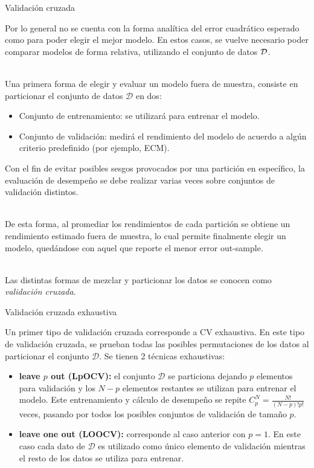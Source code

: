 \documentclass[9pt]{beamer}
\begin{document}
\begin{frame}{Validación cruzada}

Por lo general no se cuenta con la forma analítica del error cuadrático esperado como para poder elegir el mejor modelo. En estos casos, se vuelve necesario poder comparar modelos de forma relativa, utilizando el conjunto de datos ${\mathcal D}$.\\~\ \pause

Una primera forma de elegir y evaluar un modelo fuera de muestra, consiste en particionar el conjunto de datos $\mathcal{D}$ en dos:

\begin{itemize}
	\item Conjunto de entrenamiento: se utilizará para entrenar el modelo.\pause
	\item Conjunto de validación: medirá el rendimiento del modelo de acuerdo a algún criterio predefinido (por ejemplo, ECM).\pause
\end{itemize}

Con el fin de evitar posibles sesgos provocados por una partición en específico, la evaluación de desempeño se debe realizar varias veces sobre conjuntos de validación distintos.\\~\ \pause

De esta forma, al promediar los rendimientos de cada partición se obtiene un rendimiento estimado fuera de muestra, lo cual permite finalmente elegir un modelo, quedándose con aquel que reporte el menor error out-sample.\\~\ \pause

Las distintas formas de mezclar y particionar los datos se conocen como \emph{validación cruzada}.
	
\end{frame}


\begin{frame}{Validación cruzada exhaustiva}

Un primer tipo de validación cruzada corresponde a CV exhaustiva. En este tipo de validación cruzada, se prueban todas las posibles permutaciones de los datos al particionar el conjunto $\mathcal{D}$. \pause Se tienen 2 técnicas exhaustivas:

\begin{itemize}
	\item \textbf{leave $p$ out (LpOCV):} el conjunto $\mathcal{D}$ se particiona dejando $p$ elementos para validación y los $N-p$ elementos restantes se utilizan para entrenar el modelo. Este entrenamiento y cálculo de desempeño se repite $C_p^N=\frac{N!}{(N-p)!p!}$ veces, pasando por todos los posibles conjuntos de validación de tamaño $p$. \pause
	\item \textbf{leave one out (LOOCV):} corresponde al caso anterior con $p=1$. En este caso cada dato de $\mathcal{D}$ es utilizado como único elemento de validación mientras el resto de los datos se utiliza para entrenar.
\end{itemize}

\end{frame}
\end{document}
